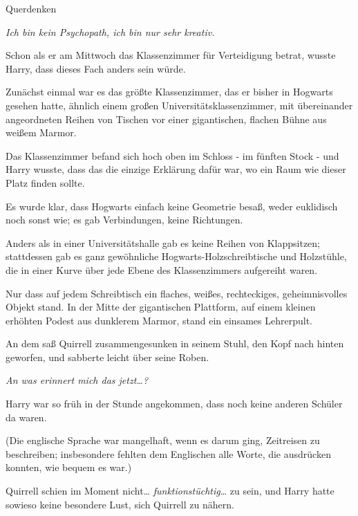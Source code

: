

\hypertarget{querdenken}{%

Querdenken

\emph{Ich bin kein Psychopath, ich bin nur sehr kreativ.}

Schon als er am Mittwoch das Klassenzimmer für Verteidigung betrat, wusste Harry, dass dieses Fach anders sein würde.

Zunächst einmal war es das größte Klassenzimmer, das er bisher in Hogwarts gesehen hatte, ähnlich einem großen Universitätsklassenzimmer, mit übereinander angeordneten Reihen von Tischen vor einer gigantischen, flachen Bühne aus weißem Marmor.

Das Klassenzimmer befand sich hoch oben im Schloss - im fünften Stock - und Harry wusste, dass das die einzige Erklärung dafür war, wo ein Raum wie dieser Platz finden sollte.

Es wurde klar, dass Hogwarts einfach keine Geometrie besaß, weder euklidisch noch sonst wie; es gab Verbindungen, keine Richtungen.

Anders als in einer Universitätshalle gab es keine Reihen von Klappsitzen; stattdessen gab es ganz gewöhnliche Hogwarts-Holzschreibtische und Holzstühle, die in einer Kurve über jede Ebene des Klassenzimmers aufgereiht waren.

Nur dass auf jedem Schreibtisch ein flaches, weißes, rechteckiges, geheimnisvolles Objekt stand. In der Mitte der gigantischen Plattform, auf einem kleinen erhöhten Podest aus dunklerem Marmor, stand ein einsames Lehrerpult.

An dem saß Quirrell zusammengesunken in seinem Stuhl, den Kopf nach hinten geworfen, und sabberte leicht über seine Roben.

\emph{An was erinnert mich das jetzt…?}

Harry war so früh in der Stunde angekommen, dass noch keine anderen Schüler da waren.

(Die englische Sprache war mangelhaft, wenn es darum ging, Zeitreisen zu beschreiben; insbesondere fehlten dem Englischen alle Worte, die ausdrücken konnten, wie bequem es war.)

Quirrell schien im Moment nicht… \emph{funktionstüchtig}… zu sein, und Harry hatte sowieso keine besondere Lust, sich Quirrell zu nähern.

}
